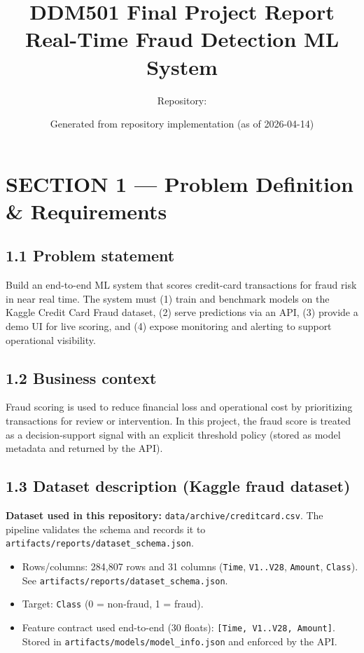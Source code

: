 \documentclass[11pt]{article}
\title{DDM501 Final Project Report\\Real-Time Fraud Detection ML System}
\author{Repository: \code{Final_Project_DMM501_Group1}}
\date{Generated from repository implementation (as of 2026-04-14)}
\newcommand{\code}[1]{\texttt{#1}}
\begin{document}
\maketitle
\tableofcontents
\newpage

\section*{SECTION 1 — Problem Definition \& Requirements}

\subsection*{1.1 Problem statement}
Build an end-to-end ML system that scores credit-card transactions for fraud risk in near real time. The system must (1) train and benchmark models on the Kaggle Credit Card Fraud dataset, (2) serve predictions via an API, (3) provide a demo UI for live scoring, and (4) expose monitoring and alerting to support operational visibility.

\subsection*{1.2 Business context}
Fraud scoring is used to reduce financial loss and operational cost by prioritizing transactions for review or intervention. In this project, the fraud score is treated as a decision-support signal with an explicit threshold policy (stored as model metadata and returned by the API).

\subsection*{1.3 Dataset description (Kaggle fraud dataset)}
\textbf{Dataset used in this repository:} \code{data/archive/creditcard.csv}. The pipeline validates the schema and records it to \code{artifacts/reports/dataset_schema.json}.

\begin{itemize}
  \item Rows/columns: 284{,}807 rows and 31 columns (\code{Time}, \code{V1..V28}, \code{Amount}, \code{Class}). See \code{artifacts/reports/dataset_schema.json}.
  \item Target: \code{Class} (0 = non-fraud, 1 = fraud).
  \item Feature contract used end-to-end (30 floats): \code{[Time, V1..V28, Amount]}. Stored in \code{artifacts/models/model_info.json} and enforced by the API.
\end{itemize}
\end{document}

